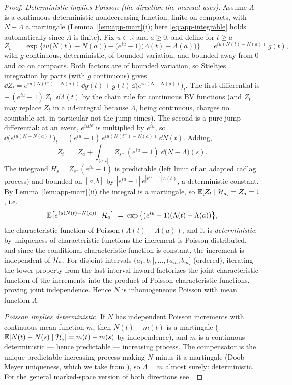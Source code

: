 \begin{proof}
\emph{Deterministic implies Poisson (the direction the manual uses).} Assume $\Lambda$ is a
continuous deterministic nondecreasing function, finite on compacts, with $N - \Lambda$ a martingale
(Lemma~\ref{lem:app-mart}(i); here \eqref{eq:app-integrable} holds automatically since $\Lambda$ is
finite). Fix $u \in \mathbb{R}$ and $a \ge 0$, and define for $t \ge a$
\begin{equation}
\label{eq:app-expmart}
Z_t \;=\; \exp\Big\{ i u \big(N(t) - N(a)\big) - \big(e^{iu} - 1\big)\big(\Lambda(t) -
\Lambda(a)\big) \Big\} \;=\; e^{iu(N(t)-N(a))}\, g(t),
\end{equation}
with $g$ continuous, deterministic, of bounded variation, and bounded away from $0$ and $\infty$ on
compacts. Both factors are of bounded variation, so Stieltjes integration by parts (with $g$
continuous) gives $\dd Z_t = e^{iu(N(t^-)-N(a))}\, \dd g(t) + g(t)\, \dd\big(e^{iu(N-N(a))}\big)_t$.
The first differential is $-\,(e^{iu}-1)\, Z_{t^-}\, \dd\Lambda(t)$ by the chain rule for continuous
BV functions (and $Z_{t^-}$ may replace $Z_t$ in a $\dd\Lambda$-integral because $\Lambda$, being
continuous, charges no countable set, in particular not the jump times). The second is a pure-jump
differential: at an event, $e^{iuN}$ is multiplied by $e^{iu}$, so $\dd\big(e^{iu(N - N(a))}\big)_t
= (e^{iu}-1)\, e^{iu(N(t^-)-N(a))}\, \dd N(t)$. Adding,
\[
Z_t \;=\; Z_a + \int_{(a,t]} Z_{s^-}\,(e^{iu}-1)\; \dd\big(N - \Lambda\big)(s).
\]
The integrand $H_s = Z_{s^-}(e^{iu}-1)$ is predictable (left limit of an adapted cadlag process) and
bounded on $[a,b]$ by $|e^{iu}-1|\, e^{|e^{iu}-1|\Lambda(b)}$, a deterministic constant. By
Lemma~\ref{lem:app-mart}(ii) the integral is a martingale, so $\mathbb{E}[Z_t \mid \mathcal{H}_a] = Z_a = 1$, i.e.
\[
\mathbb{E}\big[ e^{iu(N(t) - N(a))} \,\big|\, \mathcal{H}_a \big]
\;=\; \exp\big\{ (e^{iu} - 1)(\Lambda(t) - \Lambda(a)) \big\},
\]
the characteristic function of $\mathrm{Poisson}(\Lambda(t)-\Lambda(a))$, and it is
\emph{deterministic}: by uniqueness of characteristic functions the increment is Poisson
distributed, and since the conditional characteristic function is constant, the increment is
independent of $\mathcal{H}_a$. For disjoint intervals $(a_1,b_1], \dots, (a_m,b_m]$ (ordered), iterating
the tower property from the last interval inward factorizes the joint characteristic function of the
increments into the product of Poisson characteristic functions, proving joint independence. Hence
$N$ is inhomogeneous Poisson with mean function $\Lambda$.

\emph{Poisson implies deterministic.} If $N$ has independent Poisson increments with continuous mean
function $m$, then $N(t) - m(t)$ is a martingale ($\mathbb{E}[N(t) - N(s) \mid \mathcal{H}_s] = m(t)-m(s)$ by
independence), and $m$ is a continuous deterministic --- hence predictable --- increasing process.
The compensator is the unique predictable increasing process making $N$ minus it a martingale
(Doob--Meyer uniqueness, which we take from \cite{bremaud1996}), so $\Lambda = m$ almost surely:
deterministic. For the general marked-space version of both directions see \cite[Ch.~7]{daley2003}.
\end{proof}

